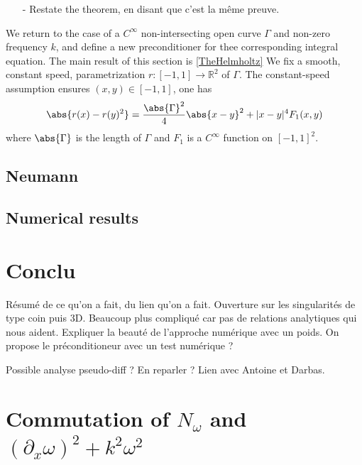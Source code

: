 \documentclass[a4paper]{article}
\begin{document}
\begin{itemize}
	\item[-] Restate the theorem, en disant que c'est la même preuve. 
\end{itemize}

We return to the case of a $C^{\infty}$ non-intersecting open curve $\Gamma$ and non-zero frequency $k$, and define a new preconditioner for thee corresponding integral equation. The main result of this section is \autoref{TheHelmholtz} We fix a smooth, constant speed, parametrization $r : [-1,1] \to \mathbb{R}^2$ of $\Gamma$. The constant-speed assumption ensures $(x,y) \in [-1,1]$, one has
\begin{equation}
\abs{r(x) - r(y)^2} = \frac{\abs{\Gamma}^2}{4} \abs{x - y}^2 + |x-y|^4 F_1(x,y)
\label{DLcourbe_param}
\end{equation}
where $\abs{\Gamma}$ is the length of $\Gamma$ and $F_1$ is a $C^{\infty}$ function on $[-1,1]^2$.


\subsection{Neumann}

\subsection{Numerical results}


\section{Conclu}

Résumé de ce qu'on a fait, du lien qu'on a fait. Ouverture sur les singularités de type coin puis 3D. Beaucoup plus compliqué car pas de relations analytiques qui nous aident. 
Expliquer la beauté de l'approche numérique avec un poids. On propose le préconditioneur avec un test numérique ? 

Possible analyse pseudo-diff ? En reparler ? Lien avec Antoine et Darbas. 

\section{Commutation of $N_\omega$ and $(\partial_x \omega)^2 + k^2\omega^2$}
\end{document}

